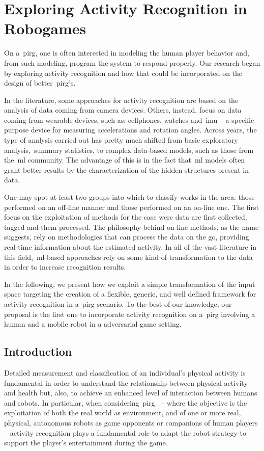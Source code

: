 \chapter{Exploring Activity Recognition in Robogames}

On a~\gls{pirg}, one is often interested in modeling the human player behavior and, from such modeling, program the system to respond properly. Our research began by exploring activity recognition and how that could be incorporated on the design of better~\gls{pirg}'s. 

In the literature, some approaches for activity recognition are based on the analysis of data coming from camera devices. Others, instead, focus on data coming from wearable devices, such as: cellphones, watches and~\gls{imu} -- a specific-purpose device for measuring accelerations and rotation angles. Across years, the type of analysis carried out has pretty much shifted from basic exploratory analysis,~\eg summary statistics, to complex data-based models, such as those from the~\gls{ml} community. The advantage of this is in the fact that~\gls{ml} models often grant better results by the characterization of the hidden structures present in data.

One may spot at least two groups into which to classify works in the area: those performed on an off-line manner and those performed on an on-line one. The first focus on the exploitation of methods for the case were data are first collected, tagged and them processed. The philosophy behind on-line methods, as the name suggests, rely on methodologies that can process the data on the go, providing real-time information about the estimated activity. In all of the vast literature in this field,~\gls{ml}-based approaches rely on some kind of transformation to the data in order to increase recognition results.

In the following, we present how we exploit a simple transformation of the input space targeting the creation of a flexible, generic, and well defined framework for activity recognition in a~\gls{pirg} scenario. To the best of our knowledge, our proposal is the first one to incorporate activity recognition on a~\glsdesc{pirg} involving a human and a mobile robot in a adversarial game setting.

\section{Introduction}

Detailed measurement and classification of an individual's physical  activity is fundamental in order to understand the relationship between physical activity and health but, also, to achieve an enhanced level of interaction between humans and robots. In particular, when considering~\glsdesc{pirg}~\cite{martinoia_physically_2013} -- where the objective is the exploitation of both the real world as environment, and of one or more real, physical, autonomous robots as game opponents or companions of human players -- activity recognition plays a fundamental role to adapt the robot strategy to support the player's entertainment during the game.

